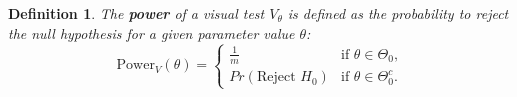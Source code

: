 \documentclass{article}
\newtheorem{dfn}{Definition}[section]
\begin{document}

\begin{dfn} \label{dfn:power}
The \textbf{power} of a visual test $V_{\theta}$ is defined as the probability to reject the null hypothesis for a given parameter value $\theta$:
    \begin{equation*}
      \text{Power}_V(\theta)= 
        \begin{cases} 
              \frac1m & \text{if $\theta \in \Theta_0$,} \\
              Pr(\text{Reject } H_0) &\text{if $\theta \in \Theta^c_0$.}
        \end{cases}
    \end{equation*}
\end{dfn}
\end{document}
